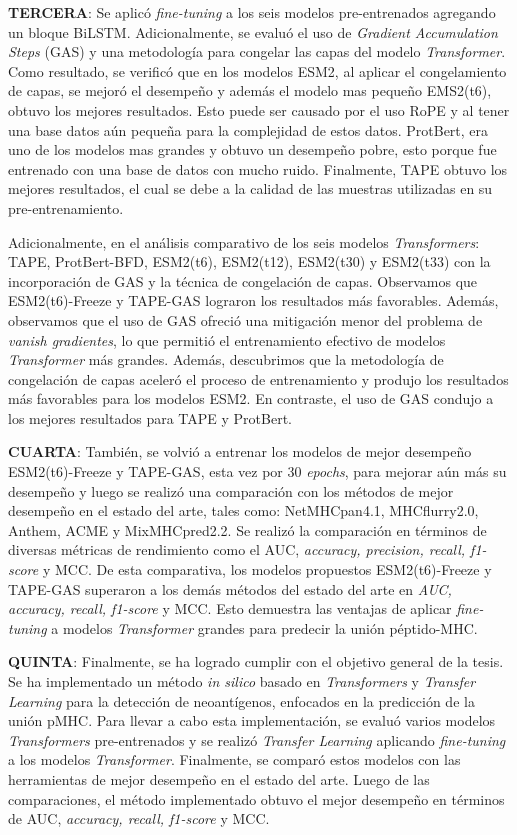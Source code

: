 \textbf{TERCERA}: Se aplicó \textit{fine-tuning} a los seis modelos pre-entrenados agregando un bloque BiLSTM. Adicionalmente, se evaluó el uso de \textit{Gradient Accumulation Steps} (GAS) y una metodología para congelar las capas del modelo \textit{Transformer}. Como resultado, se verificó que en los modelos ESM2, al aplicar el congelamiento de capas, se mejoró el desempeño y además el modelo mas pequeño EMS2(t6), obtuvo los mejores resultados. Esto puede ser causado por el uso RoPE y al tener una base datos aún pequeña para la complejidad de estos datos. ProtBert, era uno de los modelos mas grandes y obtuvo un desempeño pobre, esto porque fue entrenado con una base de datos con mucho ruido. Finalmente, TAPE obtuvo los mejores resultados, el cual se debe a la calidad de las muestras utilizadas en su pre-entrenamiento.


Adicionalmente, en el análisis comparativo de los seis modelos \textit{Transformers}: TAPE, ProtBert-BFD, ESM2(t6), ESM2(t12), ESM2(t30) y ESM2(t33) con la incorporación de GAS y la técnica de congelación de capas. Observamos que ESM2(t6)-Freeze y TAPE-GAS lograron los resultados más favorables. Además, observamos que el uso de GAS ofreció una mitigación menor del problema de \textit{vanish gradientes}, lo que permitió el entrenamiento efectivo de modelos \textit{Transformer} más grandes. Además, descubrimos que la metodología de congelación de capas aceleró el proceso de entrenamiento y produjo los resultados más favorables para los modelos ESM2. En contraste, el uso de GAS condujo a los mejores resultados para TAPE y ProtBert.

\textbf{CUARTA}: También, se volvió a entrenar los modelos de mejor desempeño ESM2(t6)-Freeze y TAPE-GAS, esta vez por 30 \textit{epochs}, para mejorar aún más su desempeño y luego se realizó una comparación con los métodos de mejor desempeño en el estado del arte, tales como: NetMHCpan4.1, MHCflurry2.0, Anthem, ACME y MixMHCpred2.2. Se realizó la comparación en términos de diversas métricas de rendimiento como el AUC, \textit{accuracy, precision, recall, f1-score} y MCC. De esta comparativa, los modelos propuestos ESM2(t6)-Freeze y TAPE-GAS superaron a los demás métodos del estado del arte en \textit{AUC, accuracy, recall, f1-score} y MCC. Esto demuestra las ventajas de aplicar \textit{fine-tuning} a modelos \textit{Transformer} grandes para predecir la unión péptido-MHC.



\textbf{QUINTA}: Finalmente, se ha logrado cumplir con el objetivo general de la tesis. Se ha implementado un método  \textit{in silico} basado en \textit{Transformers} y \textit{Transfer Learning} para la detección de neoantígenos, enfocados en la predicción de la unión pMHC. Para llevar a cabo esta implementación, se evaluó varios modelos \textit{Transformers} pre-entrenados y se realizó \textit{Transfer Learning} aplicando \textit{fine-tuning} a los modelos \textit{Transformer}. Finalmente, se comparó estos modelos con las herramientas de mejor desempeño en el estado del arte. Luego de las comparaciones, el método implementado obtuvo el mejor desempeño en términos de AUC, \textit{accuracy, recall, f1-score} y MCC.


